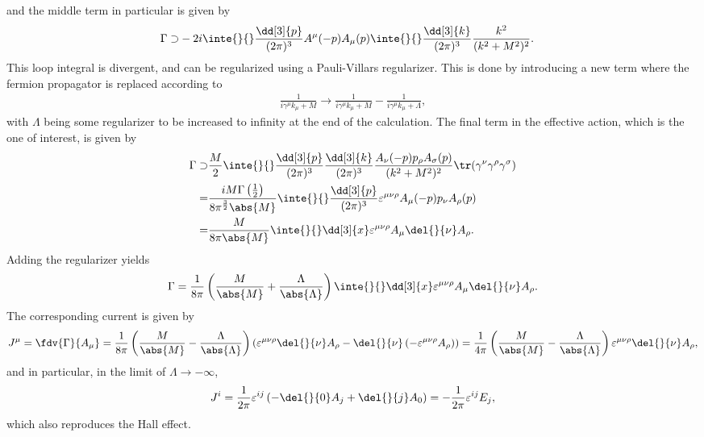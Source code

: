 and the middle term in particular is given by
\begin{align*}
	\Gamma \supset& -2i\inte{}{}\frac{\dd[3]{p}}{(2\pi)^{3}}A^{\mu}(-p)A_{\mu}(p)\inte{}{}\frac{\dd[3]{k}}{(2\pi)^{3}}\frac{k^{2}}{(k^{2} + M^{2})^{2}}.
\end{align*}
This loop integral is divergent, and can be regularized using a Pauli-Villars regularizer. This is done by introducing a new term where the fermion propagator is replaced according to
\begin{align*}
	\frac{1}{i\gamma^{\mu}k_{\mu} + M} \to \frac{1}{i\gamma^{\mu}k_{\mu} + M} - \frac{1}{i\gamma^{\mu}k_{\mu} + \Lambda},
\end{align*}
with $\Lambda$ being some regularizer to be increased to infinity at the end of the calculation. The final term in the effective action, which is the one of interest, is given by
\begin{align*}
	\Gamma \supset& \frac{M}{2}\inte{}{}\frac{\dd[3]{p}}{(2\pi)^{3}}\frac{\dd[3]{k}}{(2\pi)^{3}}\frac{A_{\nu}(-p)p_{\rho}A_{\sigma}(p)}{(k^{2} + M^{2})^{2}}\tr(\gamma^{\nu}\gamma^{\rho}\gamma^{\sigma}) \\
	             =& \frac{iM\Gamma\left(\frac{1}{2}\right)}{8\pi^{\frac{3}{2}}\abs{M}}\inte{}{}\frac{\dd[3]{p}}{(2\pi)^{3}}\varepsilon^{\mu\nu\rho}A_{\mu}(-p)p_{\nu}A_{\rho}(p) \\
	             =& \frac{M}{8\pi\abs{M}}\inte{}{}\dd[3]{x}\varepsilon^{\mu\nu\rho}A_{\mu}\del{}{\nu}A_{\rho}.
\end{align*}
Adding the regularizer yields
\begin{align*}
	\Gamma = \frac{1}{8\pi}\left(\frac{M}{\abs{M}} + \frac{\Lambda}{\abs{\Lambda}}\right)\inte{}{}\dd[3]{x}\varepsilon^{\mu\nu\rho}A_{\mu}\del{}{\nu}A_{\rho}.
\end{align*}
The corresponding current is given by
\begin{align*}
	J^{\mu} = \fdv{\Gamma}{A_{\mu}} = \frac{1}{8\pi}\left(\frac{M}{\abs{M}} - \frac{\Lambda}{\abs{\Lambda}}\right)\left(\varepsilon^{\mu\nu\rho}\del{}{\nu}A_{\rho} - \del{}{\nu}\left(-\varepsilon^{\mu\nu\rho}A_{\rho}\right)\right) = \frac{1}{4\pi}\left(\frac{M}{\abs{M}} - \frac{\Lambda}{\abs{\Lambda}}\right)\varepsilon^{\mu\nu\rho}\del{}{\nu}A_{\rho},
\end{align*}
and in particular, in the limit of $\Lambda \to -\infty$,
\begin{align*}
	J^{i} = \frac{1}{2\pi}\varepsilon^{ij}\left(-\del{}{0}A_{j} + \del{}{j}A_{0}\right) = -\frac{1}{2\pi}\varepsilon^{ij}E_{j},
\end{align*}
which also reproduces the Hall effect.

